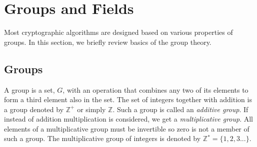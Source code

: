 \documentclass[11pt]{article}
\theoremstyle{plain}
\begin{document}
\section{Groups and Fields}

Most cryptographic algorithms are designed based on various properties
of groups. In this section, we briefly review basics of the group
theory.

\subsection{Groups}

A group is a set, $G$, with an operation that combines any two of
its elements to form a third element also in the set. The set of integers
together with addition is a group denoted by $\mathbb{Z}^{+}$ or
simply $\mathbb{Z}$. Such a group is called an \emph{additive group}.
If instead of addition multiplication is considered, we get a \emph{multiplicative
	group}. All elements of a multiplicative group must be invertible
so zero is not a member of such a group. The multiplicative group
of integers is denoted by $\mathbb{Z}{}^{*}=\{1,2,3...\}$.
\end{document}
